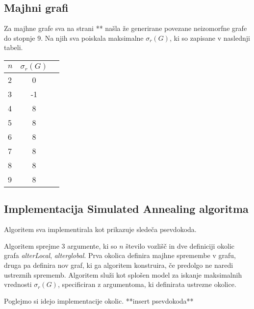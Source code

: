 \documentclass[ letterpaper, titlepage, fleqn]{article}
\begin{document}
\subsection{Majhni grafi}
Za majhne grafe sva na strani ** našla že generirane povezane neizomorfne grafe do stopnje 9.
Na njih sva poiskala maksimalne $\sigma_r(G)$, ki so zapisane v naslednji tabeli.
\begin{center}
    \begin{tabular}{ l  c  r }
      \hline
      $n$ & $\sigma_r(G)$ \\ \hline
      2 & 0 \\ \hline
      3 & -1 \\ \hline
      4 & 8 \\ \hline
      5 & 8 \\ \hline
      6 & 8 \\ \hline
      7 & 8 \\ \hline
      8 & 8 \\ \hline
      9 & 8 \\ \hline
      \hline
    \end{tabular}
  \end{center}

\subsection{Implementacija Simulated Annealing algoritma}

Algoritem sva implementirala kot prikazuje sledeča psevdokoda.

%    
%    

Algoritem sprejme 3 argumente, ki so {\em $n$} število vozlišč in dve definiciji
okolic grafa {\em alterLocal}, {\em alterglobal}. 
Prva okolica definira majhne spremembe v grafu, druga pa definira nov graf,
ki ga algoritem konstruira, če predolgo ne naredi ustreznih sprememb.
Algoritem služi kot splošen model za iskanje maksimalnih vrednosti
$\sigma_r(G)$, specificiran z argumentoma, ki definirata ustrezne okolice.

Poglejmo si idejo implementacije okolic.
**insert psevdokoda** 
\end{document}
